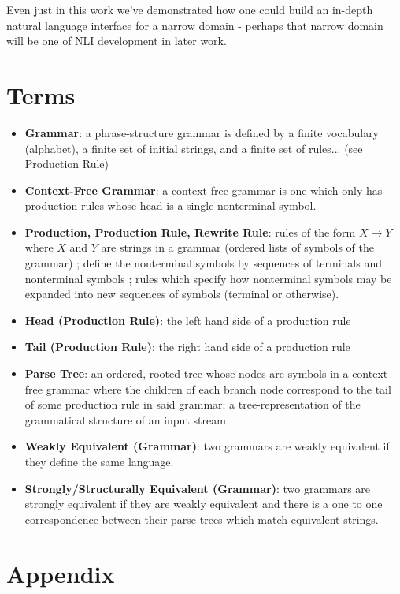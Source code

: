 \documentclass[11pt]{article}
\begin{document}
{Even just in this work we've demonstrated how one could build an in-depth natural
language interface for a narrow domain - perhaps that narrow domain will be one of 
NLI development in later work.

\clearpage
\section*{Terms}

\begin{itemize}
\item \textbf{Grammar}: a phrase-structure grammar is defined by a finite vocabulary (alphabet), a finite set of
initial strings, and a finite set of rules... \cite{chomsky} (see Production Rule)
\item \textbf{Context-Free Grammar}: a context free grammar is one which only has production rules whose head is a single nonterminal symbol.
\cite{compiler, anatomy, formal_langs}
\item \textbf{Production, Production Rule, Rewrite Rule}: rules of the form $X \rightarrow Y$ where
$X$ and $Y$ are strings in a grammar (ordered lists of symbols of the grammar)  \cite{chomsky};
define the nonterminal symbols by sequences of terminals and nonterminal symbols \cite{compiler};
rules which specify how nonterminal symbols may be expanded into new sequences of symbols (terminal or otherwise).
\item \textbf{Head (Production Rule)}: the left hand side of a production rule
\item \textbf{Tail (Production Rule)}: the right hand side of a production rule
\item \textbf{Parse Tree}: an ordered, rooted tree whose nodes are symbols in a context-free grammar where the 
children of each branch node correspond to the tail of some production rule in said grammar;
a tree-representation of the grammatical structure of an input stream \cite{anatomy}
\item \textbf{Weakly Equivalent (Grammar)}: two grammars are weakly equivalent if they define the same language.\cite{reghizzi}
\item \textbf{Strongly/Structurally Equivalent (Grammar)}: two grammars are strongly equivalent if they are weakly equivalent and there is a one to one
correspondence between their parse trees which match equivalent strings. \cite{reghizzi}
 \cite{reghizzi}
\end{itemize}

\clearpage
\section*{Appendix}

}
\end{document}
